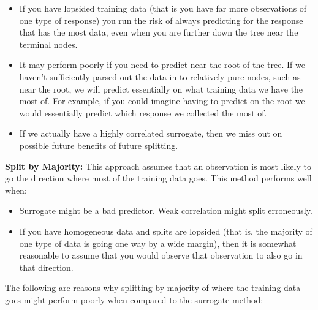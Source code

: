 \documentclass[11pt]{article}
\begin{document}
\begin{itemize}
\item If you have lopsided training data (that is you have far more 
observations of one type of response) you run the risk of always 
predicting for the response that has the most data, even when you are further 
down the tree near the terminal nodes.
\item It may perform poorly if you need to predict near the root of the tree. 
If we haven't sufficiently parsed out the data in to relatively pure nodes, 
such as near the root, we will predict essentially on what training data we 
have the most of. For example, if you could imagine having to predict on the 
root we would essentially predict which response we collected the most of.
\item If we actually have a highly correlated surrogate, then we miss out on 
possible future benefits of future splitting.
\end{itemize}

\vspace{2 mm}
\noindent
{\bf Split by Majority:} This approach assumes that an observation is most 
likely to go the direction where most of the training data goes. This method 
performs well when:

\begin{itemize}
\item Surrogate might be a bad predictor. Weak correlation might split 
erroneously.
\item If you have homogeneous data and splits are lopsided (that is, the 
majority of one type of data is going one way by a wide margin), then it is 
somewhat reasonable to assume that you would observe that observation to also 
go in that direction.
\end{itemize}

\vspace{2 mm}
\noindent
The following are reasons why splitting by majority of where the training data 
goes might perform poorly when compared to the surrogate method:
\end{document}
